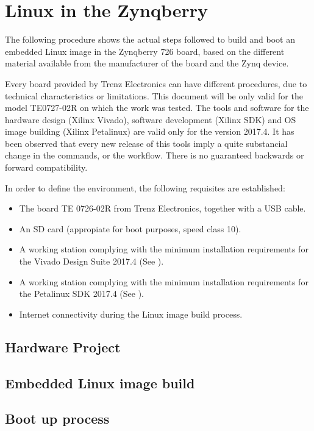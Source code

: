 
\chapter{Linux in the Zynqberry} \label{appen1}

The following procedure shows the actual steps followed to build and boot an embedded Linux image
in the Zynqberry 726 board, based on the different material available from the manufacturer of the
board and the Zynq device.

Every board provided by Trenz Electronics can have different procedures, due to technical
characteristics or limitations. This document will be only valid for the model TE0727-02R on which
the work was tested. The tools and software for the hardware design (Xilinx Vivado), software
development (Xilinx SDK) and OS image building (Xilinx Petalinux) are valid only for the version
2017.4. It has been observed that every new release of this tools imply a quite substancial change
in the commands, or the workflow. There is no guaranteed backwards or forward compatibility.

In order to define the environment, the following requisites are established:

\begin{itemize}
	\item The board TE 0726-02R from Trenz Electronics, together with a USB cable.
	\item An SD card (appropiate for boot purposes, speed class 10).
	\item A working station complying with the minimum installation requirements for the Vivado
	Design Suite 2017.4 (See \cite{UG973}).
	\item A working station complying with the minimum installation requirements for the Petalinux
	SDK 2017.4 (See \cite{UG1144}).
	\item Internet connectivity during the Linux image build process.
\end{itemize}


\section{Hardware Project}

\section{Embedded Linux image build}

\section{Boot up process}
